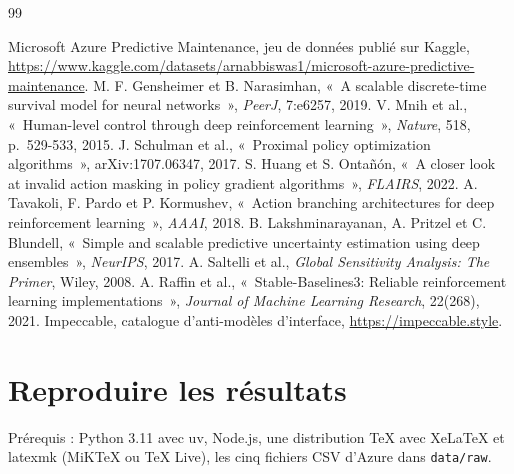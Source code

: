\documentclass[11pt,a4paper,oneside]{report}
\begin{document}
\begin{thebibliography}{99}
\small
\NoAutoSpacing
\setlength{\itemsep}{0.15em}
 Microsoft Azure Predictive Maintenance, jeu de données publié sur Kaggle, \url{https://www.kaggle.com/datasets/arnabbiswas1/microsoft-azure-predictive-maintenance}.
 M. F. Gensheimer et B. Narasimhan, «~A scalable discrete-time survival model for neural networks~», \emph{PeerJ}, 7:e6257, 2019.
 V. Mnih et al., «~Human-level control through deep reinforcement learning~», \emph{Nature}, 518, p.~529-533, 2015.
 J. Schulman et al., «~Proximal policy optimization algorithms~», arXiv:1707.06347, 2017.
 S. Huang et S. Ontañón, «~A closer look at invalid action masking in policy gradient algorithms~», \emph{FLAIRS}, 2022.
 A. Tavakoli, F. Pardo et P. Kormushev, «~Action branching architectures for deep reinforcement learning~», \emph{AAAI}, 2018.
 B. Lakshminarayanan, A. Pritzel et C. Blundell, «~Simple and scalable predictive uncertainty estimation using deep ensembles~», \emph{NeurIPS}, 2017.
 A. Saltelli et al., \emph{Global Sensitivity Analysis: The Primer}, Wiley, 2008.
 A. Raffin et al., «~Stable-Baselines3: Reliable reinforcement learning implementations~», \emph{Journal of Machine Learning Research}, 22(268), 2021.
 Impeccable, catalogue d'anti-modèles d'interface, \url{https://impeccable.style}.
\end{thebibliography}

\appendix

\chapter{Reproduire les résultats}\label{sec:reproduire}

Prérequis : Python 3.11 avec uv, Node.js, une distribution TeX avec XeLaTeX et latexmk (MiKTeX ou TeX Live), les cinq fichiers CSV d'Azure dans \texttt{data/raw}.
\end{document}
